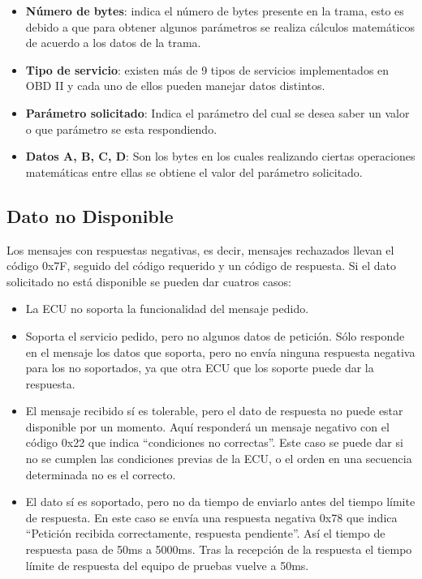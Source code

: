 \begin{itemize}
\item \textbf{Número de bytes}: indica el número de bytes presente en la trama, esto es debido a que para obtener algunos parámetros se realiza cálculos matemáticos de acuerdo a los datos de la trama.
\item \textbf{Tipo de servicio}: existen más de 9 tipos de servicios implementados en OBD II y cada uno de ellos pueden manejar datos distintos.
\item\textbf{Parámetro solicitado}: Indica el parámetro del cual se desea saber un valor o que parámetro se esta respondiendo.
\item\textbf{Datos A, B, C, D}: Son los bytes en los cuales realizando ciertas operaciones matemáticas entre ellas se obtiene el valor del parámetro solicitado.

\end{itemize}

\subsection {Dato no Disponible}
Los mensajes con respuestas negativas, es decir, mensajes rechazados llevan el código 0x7F, seguido del código requerido y un código de respuesta. Si el dato solicitado no está disponible se pueden dar cuatros casos:

\begin{itemize}
\item La ECU no soporta la funcionalidad del mensaje pedido.
\item Soporta el servicio pedido, pero no algunos datos de petición. Sólo responde en el mensaje los datos que soporta, pero no envía ninguna respuesta negativa para los no soportados, ya que otra ECU que los soporte puede dar la respuesta.
\item El mensaje recibido sí es tolerable, pero el dato de respuesta no puede estar disponible por un momento. Aquí responderá un mensaje negativo con el código 0x22 que indica “condiciones no correctas”. Este caso se puede dar si no se cumplen las condiciones previas de la ECU, o el orden en una secuencia determinada no es el correcto.
\item El dato sí es soportado, pero no da tiempo de enviarlo antes del tiempo límite de respuesta.  En este caso se envía una respuesta negativa 0x78 que indica “Petición recibida correctamente, respuesta pendiente”. Así el tiempo de respuesta pasa de 50ms a 5000ms. Tras la recepción de la respuesta el tiempo límite de respuesta del equipo de pruebas vuelve a 50ms.

\end{itemize}


